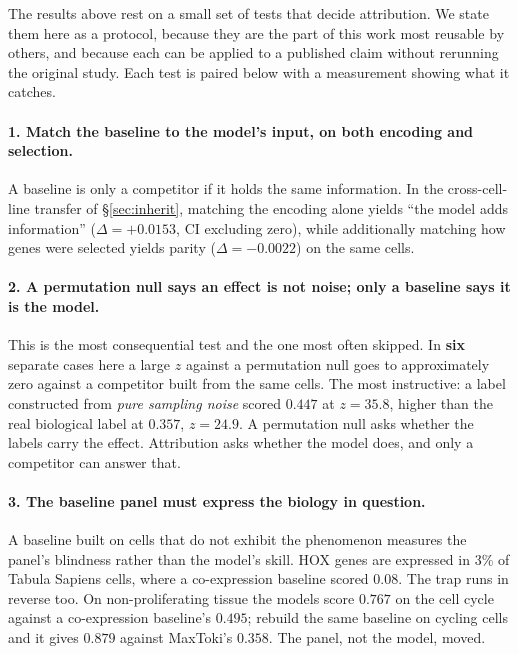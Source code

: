 \documentclass[11pt]{article}
\begin{document}
The results above rest on a small set of tests that decide attribution. We state them here as a
protocol, because they are the part of this work most reusable by others, and because each can be
applied to a published claim without rerunning the original study. Each test is paired below with a
measurement showing what it catches.

\paragraph{1. Match the baseline to the model's input, on both encoding and selection.} A baseline is
only a competitor if it holds the same information. In the cross-cell-line transfer of
\S\ref{sec:inherit}, matching the encoding alone yields ``the model adds information'' ($\Delta=+0.0153$,
CI excluding zero), while additionally matching how genes were selected yields parity
($\Delta=-0.0022$) on the same cells.

\paragraph{2. A permutation null says an effect is not noise; only a baseline says it is the model.}
This is the most consequential test and the one most often skipped. In \textbf{six} separate cases here
a large $z$ against a permutation null goes to approximately zero against a competitor built from the
same cells. The most instructive: a label constructed from \emph{pure sampling noise}
scored $0.447$ at $z=35.8$, higher than the real biological label at $0.357$, $z=24.9$. A permutation
null asks whether the labels carry the effect. Attribution asks whether the model does, and only a
competitor can answer that.

\paragraph{3. The baseline panel must express the biology in question.} A baseline built on cells that
do not exhibit the phenomenon measures the panel's blindness rather than the model's skill. HOX genes
are expressed in 3\% of Tabula Sapiens cells, where a co-expression baseline scored $0.08$. The trap
runs in reverse too. On non-proliferating tissue the models score $0.767$ on the cell cycle against a
co-expression baseline's $0.495$; rebuild the same baseline on cycling cells and it gives $0.879$
against MaxToki's $0.358$. The panel, not the model, moved.
\end{document}
